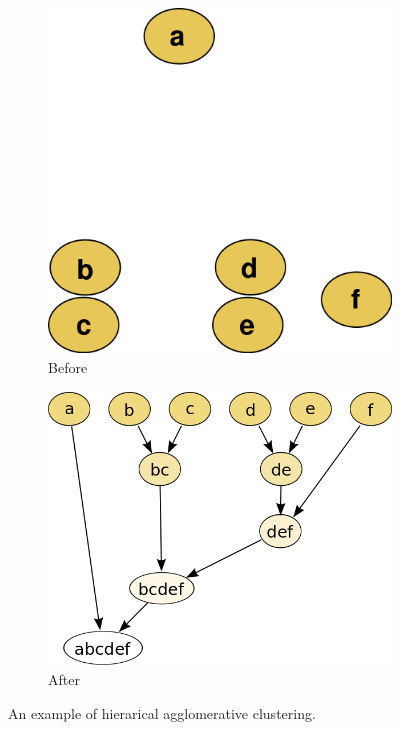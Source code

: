 \begin{figure}[htb]
  \centering
  \begin{subfigure}[b]{0.49\textwidth} 
    \centering
    \includegraphics[width=\textwidth]{figures/dendrogram1.png}
    \caption{Before}
  \end{subfigure}
  \begin{subfigure}[b]{0.49\textwidth}
	\centering
    \includegraphics[width=\textwidth]{figures/dendrogram2.png}
    \caption{After}
  \end{subfigure}
  \caption{An example of hierarical agglomerative clustering.}
  \label{fig:hac}
\end{figure}

